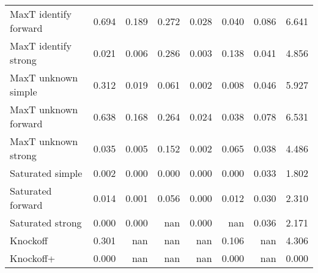 \begin{tabular}{lrrrrrrr}
MaxT identify forward &                0.694 &                       0.189 &                                           0.272 &                      0.028 &                       0.040 &                                          0.086 &                   6.641 \\
MaxT identify strong  &                0.021 &                       0.006 &                                           0.286 &                      0.003 &                       0.138 &                                          0.041 &                   4.856 \\
MaxT unknown simple   &                0.312 &                       0.019 &                                           0.061 &                      0.002 &                       0.008 &                                          0.046 &                   5.927 \\
MaxT unknown forward  &                0.638 &                       0.168 &                                           0.264 &                      0.024 &                       0.038 &                                          0.078 &                   6.531 \\
MaxT unknown strong   &                0.035 &                       0.005 &                                           0.152 &                      0.002 &                       0.065 &                                          0.038 &                   4.486 \\
Saturated simple      &                0.002 &                       0.000 &                                           0.000 &                      0.000 &                       0.000 &                                          0.033 &                   1.802 \\
Saturated forward     &                0.014 &                       0.001 &                                           0.056 &                      0.000 &                       0.012 &                                          0.030 &                   2.310 \\
Saturated strong      &                0.000 &                       0.000 &                                             nan &                      0.000 &                         nan &                                          0.036 &                   2.171 \\
Knockoff              &                0.301 &                         nan &                                             nan &                        nan &                       0.106 &                                            nan &                   4.306 \\
Knockoff+             &                0.000 &                         nan &                                             nan &                        nan &                       0.000 &                                            nan &                   0.000 \\
\bottomrule
\end{tabular}
